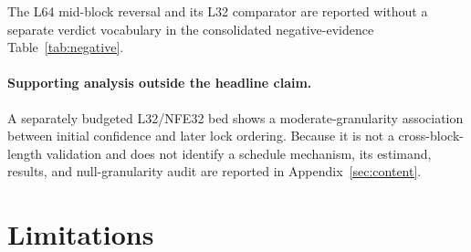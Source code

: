 \documentclass{article}
\begin{document}
\FloatBarrier


The L64 mid-block reversal and its L32 comparator are reported without a separate
verdict vocabulary in the consolidated negative-evidence
Table~\ref{tab:negative}.

\paragraph{Supporting analysis outside the headline claim.}
A separately budgeted L32/NFE32 bed shows a moderate-granularity association
between initial confidence and later lock ordering.  Because it is not a
cross-block-length validation and does not identify a schedule mechanism, its
estimand, results, and null-granularity audit are reported in
Appendix~\ref{sec:content}.

\section{Limitations}\label{sec:limits}
\end{document}
